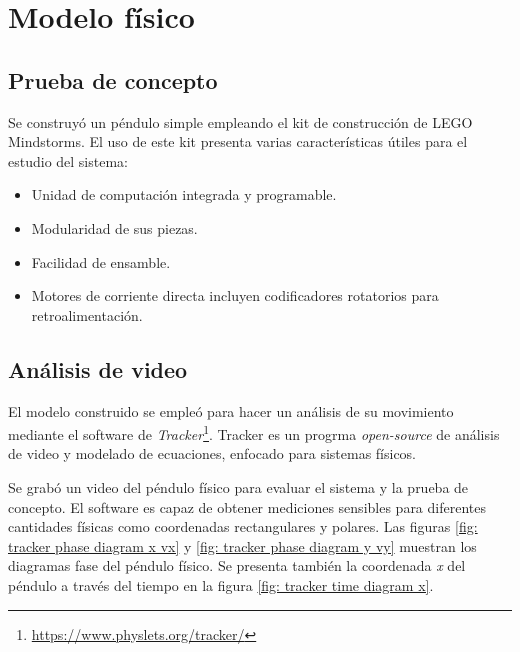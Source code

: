 \section{Modelo físico}
\subsection{Prueba de concepto}

Se construyó un péndulo simple empleando 
el kit de construcción de LEGO Mindstorms.
El uso de este kit presenta varias características
útiles para el estudio del sistema:
\begin{itemize}
 \item Unidad de computación integrada y programable.
 \item Modularidad de sus piezas.
 \item Facilidad de ensamble.
 \item Motores de corriente directa incluyen 
 codificadores rotatorios para retroalimentación.
\end{itemize}

\subsection{Análisis de video}

El modelo construido se empleó para hacer un análisis 
de su movimiento mediante el software de 
\emph{Tracker}\footnote{\url{https://www.physlets.org/tracker/}}.
Tracker es un progrma \emph{open-source} de análisis de 
video y modelado de ecuaciones, 
enfocado para sistemas físicos.

Se grabó un video del péndulo físico para evaluar el sistema
y la prueba de concepto. 
El software es capaz de obtener mediciones sensibles para
diferentes cantidades físicas como coordenadas rectangulares
y polares.
Las figuras \ref{fig: tracker phase diagram x vx} y 
\ref{fig: tracker phase diagram y vy}
muestran los diagramas fase del péndulo físico.
Se presenta también la coordenada \emph{x}
del péndulo a través del tiempo en la figura \ref{fig: tracker time diagram x}.

